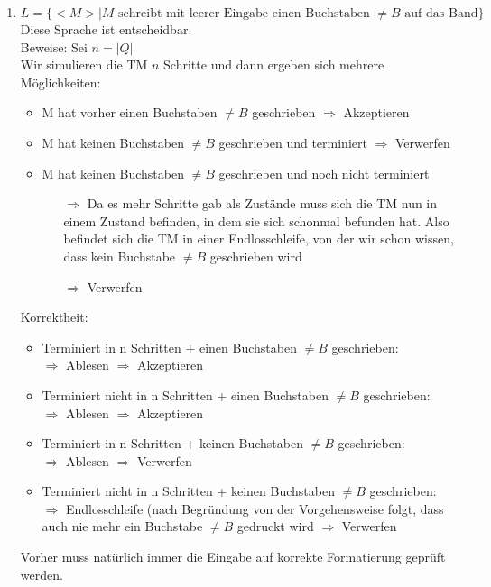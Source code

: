 \documentclass[a4paper,11pt]{scrartcl}
\begin{document}
\begin{enumerate}[label=\alph*)]
	\item	$L = \{<M> \vert M \text{ schreibt mit leerer Eingabe einen Buchstaben } \neq B \text{ auf das Band}\}$\\
			Diese Sprache ist entscheidbar.\\
			Beweise: Sei $n = \vert Q \vert$\\
			Wir simulieren die TM $n$ Schritte und dann ergeben sich mehrere Möglichkeiten:
			\begin{itemize}
			\item M hat vorher einen Buchstaben $\neq B$ geschrieben $\Rightarrow$ Akzeptieren
			\item M hat keinen Buchstaben $\neq B$ geschrieben und terminiert $\Rightarrow$ Verwerfen
			\item M hat keinen Buchstaben $\neq B$ geschrieben und noch nicht terminiert
				\begin{itemize}
				\item[$\Rightarrow$] Da es mehr Schritte gab als Zustände muss sich die TM nun in einem Zustand befinden, in dem sie sich schonmal befunden hat. Also befindet sich die TM in einer Endlosschleife, von der wir schon wissen, dass kein Buchstabe $\neq B$ geschrieben wird
				\item[$\Rightarrow$] Verwerfen
				\end{itemize}
			\end{itemize}
			Korrektheit:
				\begin{itemize}
				\item	Terminiert in n Schritten + einen Buchstaben $\neq B$ geschrieben:\\
						$\Rightarrow$ Ablesen $\Rightarrow$ Akzeptieren
				\item 	Terminiert nicht in n Schritten + einen Buchstaben $\neq B$ geschrieben:\\
						$\Rightarrow$ Ablesen $\Rightarrow$ Akzeptieren
				\item	Terminiert in n Schritten + keinen Buchstaben $\neq B$ geschrieben:\\
						$\Rightarrow$ Ablesen $\Rightarrow$ Verwerfen
				\item 	Terminiert nicht in n Schritten + keinen Buchstaben $\neq B$ geschrieben:\\
						$\Rightarrow$ Endlosschleife (nach Begründung von der Vorgehensweise folgt, dass auch nie mehr ein Buchstabe $\neq B$ gedruckt wird $\Rightarrow$ Verwerfen
				\end{itemize}
			Vorher muss natürlich immer die Eingabe auf korrekte Formatierung geprüft werden.
	\end{enumerate}
	
\end{document}
